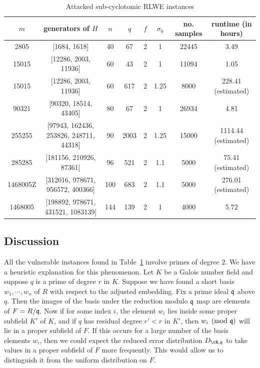 \documentclass{amsart}
\begin{document}
\begin{table}[H] \label{tab: attacked}
\caption{Attacked sub-cyclotomic RLWE instances}
\begin{tabular}{c|c|c|c|c|c|c|c}
$m$ & generators of $H$ & $n$ & $q$ & $f$ & $\sigma_0$ & no. samples & runtime (in hours) \\ \hline
2805 &  [1684, 1618] & 40 & 67 & 2 & 1 & 22445 & 3.49 \\
15015 & [12286, 2003, 11936] & 60 & 43 & 2 & 1 & 11094 & 1.05 \\
15015 & [12286, 2003, 11936] & 60 & 617 & 2 & 1.25 & 8000 & 228.41 (estimated) \footnotemark  \\
90321 & [90320, 18514, 43405] & 80 & 67 & 2 & 1 & 26934 & 4.81 \\
255255 &  [97943, 162436, 253826, 248711, 44318] & 90 & 2003 & 2 & 1.25 & 15000 &  1114.44 (estimated) \\
285285 & [181156, 210926, 87361] & 96 & 521  & 2 & 1.1 & 5000 & 75.41 (estimated) \\
1468005Z & [312016, 978671, 956572, 400366] & 100 & 683 & 2 & 1.1
& 5000 &  276.01 (estimated) \\
1468005 & [198892, 978671, 431521, 1083139] & 144 & 139 & 2 & 1 &  4000 &  5.72
\end{tabular}
\end{table}





\subsection{Discussion}
All the vulnerable instances found in Table~\ref{tab: attacked} involve primes of degree $2$.  We have a heuristic explanation for this phenomenon.  Let $K$  be a Galois number field and suppose $q$ is a prime of degree $r$ in $K$. Suppose we have found a short basis $w_1,\cdots, w_n$ of $R$ with respect to the adjusted embedding. Fix a prime ideal $\mathfrak{q}$ above $q$. Then the images of the basis under the reduction modulo $\mathfrak{q}$ map are elements of $F = R/\mathfrak{q}$. Now if for some index $i$, the element $w_i$ lies inside some proper subfield $K'$ of $K$, and if $q$ has residual degree $r' < r$ in $K'$, then $w_i \pmod{\mathfrak{q}}$ will lie in a proper subfield of $F$. If this occurs for a large number of the basis elements $w_i$, then we could  expect the reduced error distribution $D_{\cR,\fq}$ to take values in a proper subfield of $F$ more frequently. This would allow us to distinguish it from the uniform distribution on $F$.
\end{document}
